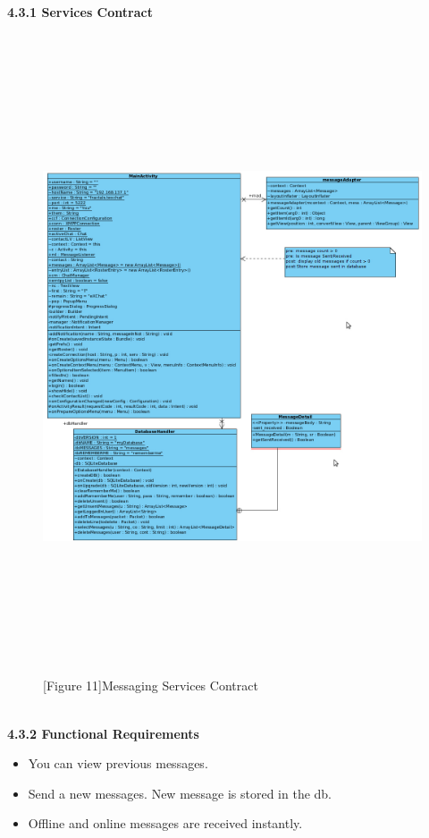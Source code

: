 \documentclass[29pt,a4paper]{moderncv}
\begin{document}
		\noindent\textbf{4.3.1 Services Contract}\\
				\begin{figure}
				\centering
					\\ \includegraphics[width=7in, height=7.1in]{./4_MessagingSC.jpg}
					\\\caption{[Figure 11]Messaging Services Contract}
				\end{figure}\\
		
		\noindent\textbf{4.3.2 Functional Requirements}
			\begin{itemize}
				\item You can view previous messages.
				\item Send a new messages. New message is stored in the db.
				\item Offline and online messages are received instantly.
			\end{itemize}
			
\end{document}
